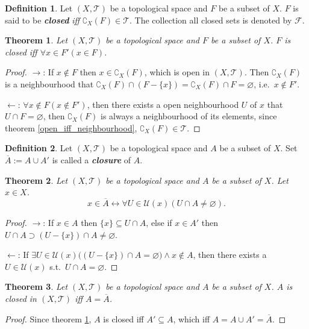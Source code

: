 \documentclass{article}%
\theoremstyle{plain}
\newtheorem{theorem}{Theorem}[section] %
\theoremstyle{definition}
\newtheorem{definition}{Definition}[section] %
\newcommand*{\indexbf}[1]{\textit{\textbf{#1}}\index{#1}}
\begin{document}
\begin{definition}\label{closed_set}
Let $(X,\mathscr T)$ be a topological space and $F$ be a subset of $X$. $F$ is said to be \indexbf{closed} \emph{iff} $\complement_X (F) \in \mathscr T$. The collection all closed sets is denoted by $\mathscr F$.
\end{definition}

\begin{theorem}\label{closed_iff_accumulation}
Let $(X,\mathscr T)$ be a topological space and $F$ be a subset of $X$. $F$ is closed \emph{iff} $\forall x\in F' (x\in F)$.
\end{theorem}
\begin{proof}
$\to$: 
If $x\notin F$ then $x\in \complement_X (F)$, which is open in $(X,\mathscr T)$. 
Then $\complement_X (F)$ is a neighbourhood that $\complement_X (F) \cap (F-\{x\}) = \complement_X (F) \cap F =\varnothing$, i.e.\ $x\notin F'$.

$\leftarrow$:
$\forall x\notin F(x\notin F')$, then there exists a open neighbourhood $U$ of $x$ that $U\cap F = \varnothing$, then $\complement_X (F)$ is always a neighbourhood of its elements, since theorem \ref{open_iff_neighbourhood}, $\complement_X (F) \in \mathscr T$.
\end{proof}

\begin{definition}\label{closure}
Let $(X,\mathscr T)$ be a topological space and $A$ be a subset of $X$. Set $\overline A := A\cup A'$ is called a \indexbf{closure} of $A$.
\end{definition}

\begin{theorem}\label{closure_neighbourhood}
Let $(X,\mathscr T)$ be a topological space and $A$ be a subset of $X$. Let $x\in X$.
\[
	x\in \overline A \leftrightarrow
		\forall U\in\mathscr U(x)(
			U\cap A\neq \varnothing).
\]
\end{theorem}
\begin{proof}
$\to$: If $x\in A$ then $\{x\}\subseteq U\cap A$, 
else if $x\in A'$ then $U\cap A \supset (U-\{x\})\cap A \neq \varnothing$.

$\leftarrow$: 
If $\exists U\in\mathscr U(x)\big(
	(U-\{x\})\cap A= \varnothing\big)\wedge x\notin A$, 
then there exists a $U\in \mathscr U(x)$ s.t.\ $U\cap A=\varnothing$. 
\end{proof}


\begin{theorem}\label{closed_iff_closure}
Let $(X,\mathscr T)$ be a topological space and $A$ be a subset of $X$. 
$A$ is closed in $(X,\mathscr T)$ \emph{iff} $A=\overline A$.
\end{theorem}
\begin{proof}
Since theorem \ref{closed_iff_accumulation}, $A$ is closed iff $A'\subseteq A$, which iff $A = A\cup A' = \overline A$.
\end{proof}
\end{document}
